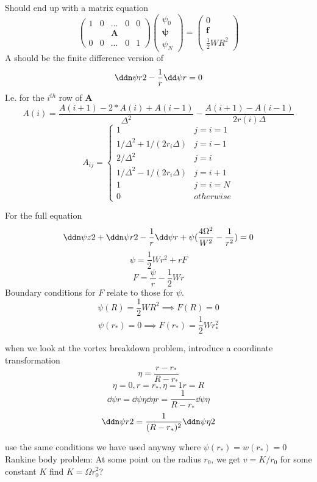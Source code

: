 \documentclass{X:/Documents/Coding/Latex/myreport}
\begin{document}
Should end up with a matrix equation
\[
\begin{pmatrix}
1 & 0&\hdots &0 & 0 \\
&&\mathbf{A}&&\\
0&0&\hdots & 0 & 1
\end{pmatrix}
\begin{pmatrix}
\psi_0\\
\mathbf{\psi}\\
\psi_N
\end{pmatrix}
=
\begin{pmatrix}
0\\
\mathbf{f}\\
\frac12 W R^2
\end{pmatrix}
\]
A should be the finite difference version of 
\[\ddn \psi r 2 - \frac1r \dd \psi r = 0\]
I.e. for the $i^{th}$ row of $\mathbf{A}$
\[A(i) =\frac{A(i+1) - 2*A(i) + A(i-1)}{\Delta ^2} - \frac{A(i+1) - A(i-1)}{2r(i)\Delta } \]
\[A_{ij} =\begin{cases}
1    & j=i=1\\
1/\Delta^2 +1/(2r_i \Delta)& j=i-1\\
2/\Delta^2    & j=i\\
1/\Delta^2 -1/(2r_i \Delta)& j=i+1\\
1   & j=i=N\\
0   & otherwise
\end{cases}\]

For the full equation
\[\ddn\psi z2 + \ddn\psi r2 - \frac1r \dd\psi r + \psi(\frac{4\Omega^2}{W^2} - \frac1{r^2}) = 0 \]
\[\psi = \frac12 Wr^2 + rF \]
\[F = \frac{\psi}{r} - \frac12 Wr\]
Boundary conditions for $F$ relate to those for $\psi$.
\[\psi(R) = \frac12 WR^2 \implies F(R) = 0\]
\[\psi(r_*) = 0 \implies F(r_*) = \frac12 Wr_*^2\]





when we look at the vortex breakdown problem, introduce a coordinate transformation
\[\eta = \frac{r - r_*}{R-r_*}\]
\[\eta = 0, r=r_*, \eta = 1 r=R\]
\[\dd\psi r = \dd\psi \eta \dd\eta r = \frac{1}{R-r_*} \dd\psi \eta\]
\[\ddn \psi r2 = \frac{1}{(R-r_*)^2} \ddn \psi \eta 2\]



use the same conditions we have used anyway where $\psi(r_*) = w(r_*) = 0$
Rankine body problem:
At some point on the radius $r_0$, we get $v = K/r_0$ for some constant $K$ 
find $K = \Omega r_0^2$?

\end{document}
